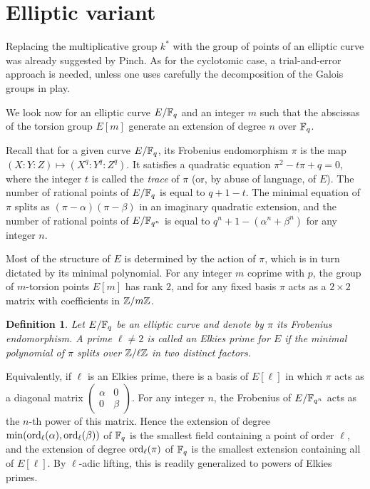 \documentclass{article}
\newtheorem{Def}{Definition}
\begin{document}
\section{Elliptic variant}

Replacing the multiplicative group $k^\ast$ with the group of points
of an elliptic curve was already suggested by Pinch. As for the
cyclotomic case, a trial-and-error approach is needed, unless one uses
carefully the decomposition of the Galois groups in play.

We look now for an elliptic curve $E/\mathbb{F}_q$ and an integer $m$ such
that the abscissas of the torsion group $E[m]$ generate an extension
of degree $n$ over $\mathbb{F}_q$.

Recall that for a given curve $E/\mathbb{F}_q$, its Frobenius endomorphism
$\pi$ is the map $(X:Y:Z)\mapsto(X^q:Y^q:Z^q)$. It satisfies a
quadratic equation $\pi^2-t\pi+q=0$, where the integer $t$ is called
the \emph{trace} of $\pi$ (or, by abuse of language, of $E$). The
number of rational points of $E/\mathbb{F}_q$ is equal to $q+1-t$. The minimal
equation of $\pi$ splits as $(\pi-\alpha)(\pi-\beta)$ in an imaginary
quadratic extension, and the number of rational points of $E/\mathbb{F}_{q^n}$
is equal to $q^n+1-(\alpha^n+\beta^n)$ for any integer $n$.

Most of the structure of $E$ is determined by the action of $\pi$,
which is in turn dictated by its minimal polynomial. For any integer
$m$ coprime with $p$, the group of $m$-torsion points $E[m]$ has rank
$2$, and for any fixed basis $\pi$ acts as a $2\times2$ matrix with
coefficients in $\mathbb{Z}/m\mathbb{Z}$.

\begin{Def}
  Let $E/\mathbb{F}_q$ be an elliptic curve and denote by $\pi$ its Frobenius
  endomorphism. A prime $\ell\ne2$ is called an \emph{Elkies prime}
  for $E$ if the minimal polynomial of $\pi$ splits over $\mathbb{Z}/\ell\mathbb{Z}$
  in two distinct factors.
\end{Def}

Equivalently, if $\ell$ is an Elkies prime, there is a basis of
$E[\ell]$ in which $\pi$ acts as a diagonal matrix
$\left(\begin{smallmatrix}\alpha&0\\0&\beta\end{smallmatrix}\right)$. For
any integer $n$, the Frobenius of $E/\mathbb{F}_{q^n}$ acts as the $n$-th
power of this matrix. Hence the extension of degree
$\min(\operatorname{ord}_\ell(\alpha),\operatorname{ord}_\ell(\beta))$ of $\mathbb{F}_q$ is the smallest
field containing a point of order $\ell$, and the extension of degree
$\operatorname{ord}_\ell(\pi)$ of $\mathbb{F}_q$ is the smallest extension containing all of
$E[\ell]$. By $\ell$-adic lifting, this is readily generalized to
powers of Elkies primes.
\end{document}
